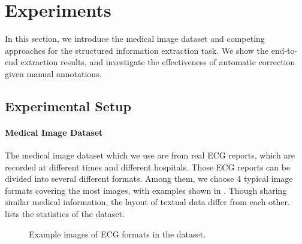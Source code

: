 \section{Experiments}
\label{sec:eval}

In this section, we introduce the medical image dataset and
competing approaches for the structured information extraction task.
We show the end-to-end extraction results,
and investigate the effectiveness of automatic correction
given manual annotations.

\subsection{Experimental Setup}
\paragraph{Medical Image Dataset}
The medical image dataset which we use are from real ECG reports,
which are recorded at different times and different hospitals.
Those ECG reports can be divided into several different formats.
Among them, we choose 4 typical image formats covering the most images,
with examples shown in .
Though sharing similar medical information,
the layout of textual data differ from each other.
 lists the statistics of the dataset.

\begin{figure}[ht]
\centering
{}
{}
\hfill
{}
\caption{Example images of ECG formats in the dataset.}
\label{fig:dataset}
\end{figure}

